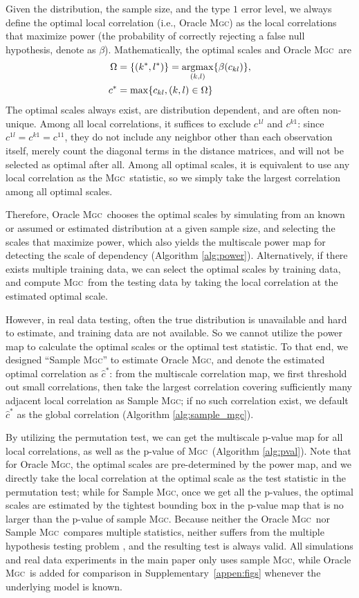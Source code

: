\documentclass[11pt]{article}
\providecommand{\sct}[1]{{\normalfont\textsc{#1}}}
\newcommand{\G}{c}
\newcommand{\Mgc}{\sct{Mgc}}
\newcommand{\argmax}{\operatornamewithlimits{argmax}}
\begin{document}
Given the distribution, the sample size, and the type $1$ error level, we always define the optimal local correlation (i.e., Oracle \Mgc) as the local correlations that maximize power (the probability of correctly rejecting a false null hypothesis, denote as $\beta$). Mathematically, the optimal scales and Oracle \Mgc~are
\begin{align*}
\Omega &=\{(k^{*},l^{*})\} =\argmax_{(k,l)}\{\beta(\G_{kl})\}, \\
\G^{*} &=\max\{\G_{kl},(k,l) \in \Omega\} 
\end{align*}
The optimal scales always exist,  are distribution dependent, and are often non-unique. Among all local correlations, it suffices to exclude $\G^{1l}$ and $\G^{k1}$: since $\G^{1l}=\G^{k1}=\G^{11}$, they do not include any neighbor other than each observation itself, merely count the diagonal terms in the distance matrices, and will not be selected as optimal after all. Among all optimal scales, it is equivalent to use any local correlation as the \Mgc~statistic, so we simply take the largest correlation among all optimal scales. 

Therefore, Oracle \Mgc~chooses the optimal scales by simulating from an known or assumed or estimated distribution at a given sample size, and selecting the scales that maximize power, which also yields the multiscale power map for detecting the scale of dependency (Algorithm \ref{alg:power}). Alternatively, if there exists multiple training data, we can select the optimal scales by training data, and compute \Mgc~from the testing data by taking the local correlation at the estimated optimal scale. 

However, in real data testing, often the true distribution is unavailable and hard to estimate, and training data are not available. 
So we cannot utilize the power map to calculate the optimal scales or the optimal test statistic.
To that end, we designed  ``Sample \Mgc'' to estimate Oracle \Mgc, and denote the estimated optimal correlation as $\hat{\G}^{*}$: from the multiscale correlation map, we first threshold out small correlations, then take the largest correlation covering sufficiently many adjacent local correlation as Sample \Mgc; if no such correlation exist, we default $\hat{\G}^{*}$ as the global correlation (Algorithm \ref{alg:sample_mgc}). 

By utilizing the permutation test, we can get the multiscale p-value map for all local correlations, as well as the p-value of \Mgc~(Algorithm \ref{alg:pval}). Note that for Oracle \Mgc, the optimal scales are pre-determined by the power map, and we directly take the local correlation at the optimal scale as the test statistic in the permutation test; while for Sample \Mgc, once we get all the p-values,  the optimal scales are estimated by the tightest bounding box in the p-value map that is no larger than the p-value of sample \Mgc. Because neither the Oracle \Mgc~nor Sample \Mgc~compares multiple statistics, neither suffers from the multiple hypothesis testing problem \cite{Benjamini1995}, and the resulting test is always valid. All simulations and real data experiments in the main paper only uses sample \Mgc, while Oracle \Mgc~is added for comparison in Supplementary~\ref{appen:figs} whenever the underlying model is known.
\end{document}
